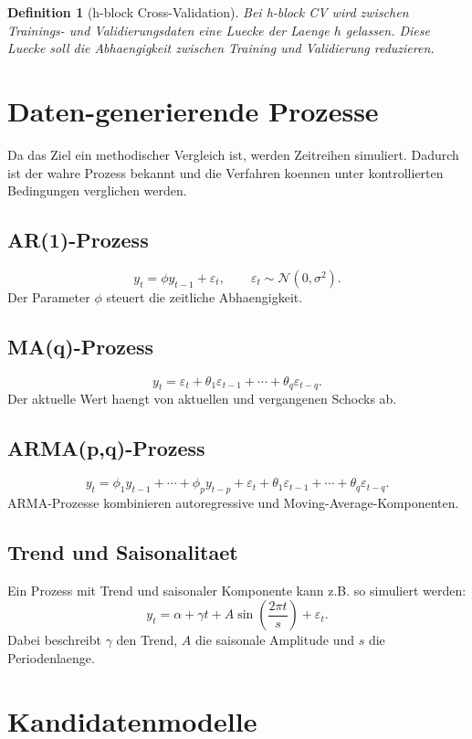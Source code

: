 \documentclass[11pt,a4paper]{article}
\newtheorem{definition}{Definition}
\begin{document}
\begin{definition}[h-block Cross-Validation]
Bei h-block CV wird zwischen Trainings- und Validierungsdaten eine Luecke der
Laenge $h$ gelassen. Diese Luecke soll die Abhaengigkeit zwischen Training und
Validierung reduzieren.
\end{definition}

\section{Daten-generierende Prozesse}

Da das Ziel ein methodischer Vergleich ist, werden Zeitreihen simuliert. Dadurch
ist der wahre Prozess bekannt und die Verfahren koennen unter kontrollierten
Bedingungen verglichen werden.

\subsection{AR(1)-Prozess}
\[
  y_t = \phi y_{t-1} + \varepsilon_t,
  \qquad
  \varepsilon_t \sim \mathcal{N}(0,\sigma^2).
\]
Der Parameter $\phi$ steuert die zeitliche Abhaengigkeit.

\subsection{MA(q)-Prozess}
\[
  y_t = \varepsilon_t + \theta_1\varepsilon_{t-1}
  + \cdots + \theta_q\varepsilon_{t-q}.
\]
Der aktuelle Wert haengt von aktuellen und vergangenen Schocks ab.

\subsection{ARMA(p,q)-Prozess}
\[
  y_t =
  \phi_1 y_{t-1} + \cdots + \phi_p y_{t-p}
  + \varepsilon_t
  + \theta_1\varepsilon_{t-1}
  + \cdots + \theta_q\varepsilon_{t-q}.
\]
ARMA-Prozesse kombinieren autoregressive und Moving-Average-Komponenten.

\subsection{Trend und Saisonalitaet}
Ein Prozess mit Trend und saisonaler Komponente kann z.B. so simuliert werden:
\[
  y_t = \alpha + \gamma t + A \sin\left(\frac{2\pi t}{s}\right)
  + \varepsilon_t.
\]
Dabei beschreibt $\gamma$ den Trend, $A$ die saisonale Amplitude und $s$ die
Periodenlaenge.

\section{Kandidatenmodelle}
\end{document}
